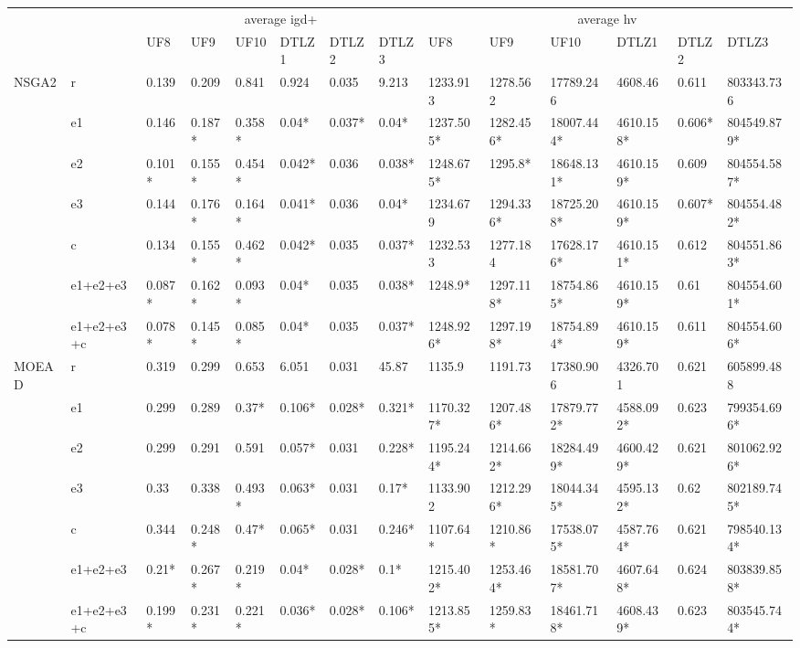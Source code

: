 \begin{tabular}{p{0.5cm}p{0.8cm}|p{0.5cm}p{0.5cm}p{0.5cm}p{0.5cm}p{0.5cm}p{0.5cm}||p{0.5cm}p{0.5cm}p{0.66cm}p{0.5cm}p{0.5cm}p{0.8cm}}
\toprule
 &  & \multicolumn{6}{c}{average igd+} & \multicolumn{6}{c}{average hv} \\
 &  & UF8 & UF9 & UF10 & DTLZ1 & DTLZ2 & DTLZ3 & UF8 & UF9 & UF10 & DTLZ1 & DTLZ2 & DTLZ3 \\
\midrule
\multirow[c]{7}{*}{NSGA2} & r & 0.139 & 0.209 & 0.841 & 0.924 & 0.035 & 9.213 & 1233.913 & 1278.562 & 17789.246 & 4608.46 & 0.611 & 803343.736 \\
 & e1 & 0.146 & 0.187* & 0.358* & 0.04* & 0.037* & 0.04* & 1237.505* & 1282.456* & 18007.444* & 4610.158* & 0.606* & 804549.879* \\
 & e2 & 0.101* & 0.155* & 0.454* & 0.042* & 0.036 & 0.038* & 1248.675* & 1295.8* & 18648.131* & 4610.159* & 0.609 & 804554.587* \\
 & e3 & 0.144 & 0.176* & 0.164* & 0.041* & 0.036 & 0.04* & 1234.679 & 1294.336* & 18725.208* & 4610.159* & 0.607* & 804554.482* \\
 & c & 0.134 & 0.155* & 0.462* & 0.042* & 0.035 & 0.037* & 1232.533 & 1277.184 & 17628.176* & 4610.151* & 0.612 & 804551.863* \\
 & e1+e2+e3 & 0.087* & 0.162* & 0.093* & 0.04* & 0.035 & 0.038* & 1248.9* & 1297.118* & 18754.865* & 4610.159* & 0.61 & 804554.601* \\
 & e1+e2+e3+c & 0.078* & 0.145* & 0.085* & 0.04* & 0.035 & 0.037* & 1248.926* & 1297.198* & 18754.894* & 4610.159* & 0.611 & 804554.606* \\
\cline{1-14}
\multirow[c]{7}{*}{MOEAD} & r & 0.319 & 0.299 & 0.653 & 6.051 & 0.031 & 45.87 & 1135.9 & 1191.73 & 17380.906 & 4326.701 & 0.621 & 605899.488 \\
 & e1 & 0.299 & 0.289 & 0.37* & 0.106* & 0.028* & 0.321* & 1170.327* & 1207.486* & 17879.772* & 4588.092* & 0.623 & 799354.696* \\
 & e2 & 0.299 & 0.291 & 0.591 & 0.057* & 0.031 & 0.228* & 1195.244* & 1214.662* & 18284.499* & 4600.429* & 0.621 & 801062.926* \\
 & e3 & 0.33 & 0.338 & 0.493* & 0.063* & 0.031 & 0.17* & 1133.902 & 1212.296* & 18044.345* & 4595.132* & 0.62 & 802189.745* \\
 & c & 0.344 & 0.248* & 0.47* & 0.065* & 0.031 & 0.246* & 1107.64* & 1210.86* & 17538.075* & 4587.764* & 0.621 & 798540.134* \\
 & e1+e2+e3 & 0.21* & 0.267* & 0.219* & 0.04* & 0.028* & 0.1* & 1215.402* & 1253.464* & 18581.707* & 4607.648* & 0.624 & 803839.858* \\
 & e1+e2+e3+c & 0.199* & 0.231* & 0.221* & 0.036* & 0.028* & 0.106* & 1213.855* & 1259.83* & 18461.718* & 4608.439* & 0.623 & 803545.744* \\
\cline{1-14}
\bottomrule
\end{tabular}
